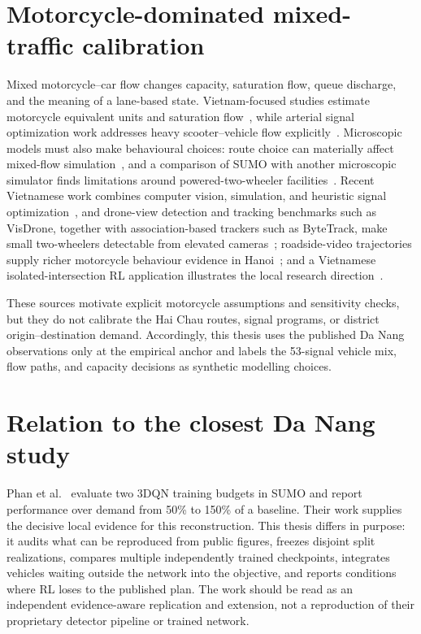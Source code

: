 \documentclass[12pt,a4paper]{report}
\begin{document}
\section{Motorcycle-dominated mixed-traffic calibration}
Mixed motorcycle--car flow changes capacity, saturation flow, queue discharge, and the meaning of a lane-based state. Vietnam-focused studies estimate motorcycle equivalent units and saturation flow~\cite{cao2012capacity,nguyen2016saturation}, while arterial signal optimization work addresses heavy scooter--vehicle flow explicitly~\cite{lan2016scooters}. Microscopic models must also make behavioural choices: route choice can materially affect mixed-flow simulation~\cite{fadilah2024routechoice}, and a comparison of SUMO with another microscopic simulator finds limitations around powered-two-wheeler facilities~\cite{kuo2023ptwsim}. Recent Vietnamese work combines computer vision, simulation, and heuristic signal optimization~\cite{vu2025motorcyclesignal}, and drone-view detection and tracking benchmarks such as VisDrone, together with association-based trackers such as ByteTrack, make small two-wheelers detectable from elevated cameras~\cite{zhu2022visdrone,zhang2022bytetrack}; roadside-video trajectories supply richer motorcycle behaviour evidence in Hanoi~\cite{wang2026motorcycletrajectories}; and a Vietnamese isolated-intersection RL application illustrates the local research direction~\cite{trinh2025isolatedrl}.

These sources motivate explicit motorcycle assumptions and sensitivity checks, but they do not calibrate the Hai Chau routes, signal programs, or district origin--destination demand. Accordingly, this thesis uses the published Da Nang observations only at the empirical anchor and labels the 53-signal vehicle mix, flow paths, and capacity decisions as synthetic modelling choices.

\section{Relation to the closest Da Nang study}
Phan et al.~\cite{phan2025danang} evaluate two 3DQN training budgets in SUMO and report performance over demand from 50\% to 150\% of a baseline. Their work supplies the decisive local evidence for this reconstruction. This thesis differs in purpose: it audits what can be reproduced from public figures, freezes disjoint split realizations, compares multiple independently trained checkpoints, integrates vehicles waiting outside the network into the objective, and reports conditions where RL loses to the published plan. The work should be read as an independent evidence-aware replication and extension, not a reproduction of their proprietary detector pipeline or trained network.
\end{document}

